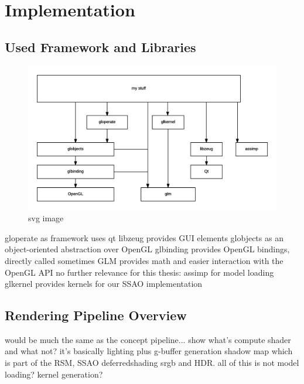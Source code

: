 

\chapter{Implementation}
\label{chap:implementation}

\section{Used Framework and Libraries}

\begin{figure}[htbp]
  \centering
  \includegraphics{graphics/Architecture}
  \caption{svg image}
\end{figure}

\begin{outline}
\1 gloperate as framework
    \2 uses qt
\1 libzeug provides GUI elements
\1 globjects as an object-oriented abstraction over OpenGL
\1 glbinding provides OpenGL bindings, directly called sometimes
\1 GLM provides math and easier interaction with the OpenGL API
\1 no further relevance for this thesis:
    \2 assimp for model loading
    \2 glkernel provides kernels for our SSAO implementation
\end{outline}

\section{Rendering Pipeline Overview}
\begin{outline}
\1 would be much the same as the concept pipeline...
\1 show what's compute shader and what not?
\1 it's basically lighting plus
    \2 g-buffer generation
    \2 shadow map which is part of the RSM,
    \2 SSAO
    \2 deferredshading
    \2 srgb and HDR.
    \2 all of this is not
\1 model loading?
\1 kernel generation?
\end{outline}


